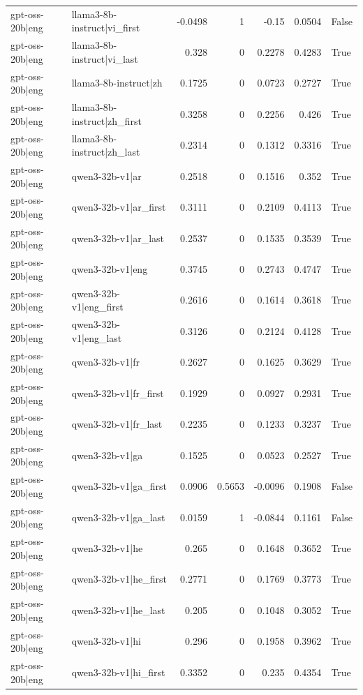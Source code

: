\begin{table}
\begin{tabular}{l l r r r r l}
gpt-oss-20b|eng & llama3-8b-instruct|vi_first & -0.0498 & 1 & -0.15 & 0.0504 & False \\
gpt-oss-20b|eng & llama3-8b-instruct|vi_last & 0.328 & 0 & 0.2278 & 0.4283 & True \\
gpt-oss-20b|eng & llama3-8b-instruct|zh & 0.1725 & 0 & 0.0723 & 0.2727 & True \\
gpt-oss-20b|eng & llama3-8b-instruct|zh_first & 0.3258 & 0 & 0.2256 & 0.426 & True \\
gpt-oss-20b|eng & llama3-8b-instruct|zh_last & 0.2314 & 0 & 0.1312 & 0.3316 & True \\
gpt-oss-20b|eng & qwen3-32b-v1|ar & 0.2518 & 0 & 0.1516 & 0.352 & True \\
gpt-oss-20b|eng & qwen3-32b-v1|ar_first & 0.3111 & 0 & 0.2109 & 0.4113 & True \\
gpt-oss-20b|eng & qwen3-32b-v1|ar_last & 0.2537 & 0 & 0.1535 & 0.3539 & True \\
gpt-oss-20b|eng & qwen3-32b-v1|eng & 0.3745 & 0 & 0.2743 & 0.4747 & True \\
gpt-oss-20b|eng & qwen3-32b-v1|eng_first & 0.2616 & 0 & 0.1614 & 0.3618 & True \\
gpt-oss-20b|eng & qwen3-32b-v1|eng_last & 0.3126 & 0 & 0.2124 & 0.4128 & True \\
gpt-oss-20b|eng & qwen3-32b-v1|fr & 0.2627 & 0 & 0.1625 & 0.3629 & True \\
gpt-oss-20b|eng & qwen3-32b-v1|fr_first & 0.1929 & 0 & 0.0927 & 0.2931 & True \\
gpt-oss-20b|eng & qwen3-32b-v1|fr_last & 0.2235 & 0 & 0.1233 & 0.3237 & True \\
gpt-oss-20b|eng & qwen3-32b-v1|ga & 0.1525 & 0 & 0.0523 & 0.2527 & True \\
gpt-oss-20b|eng & qwen3-32b-v1|ga_first & 0.0906 & 0.5653 & -0.0096 & 0.1908 & False \\
gpt-oss-20b|eng & qwen3-32b-v1|ga_last & 0.0159 & 1 & -0.0844 & 0.1161 & False \\
gpt-oss-20b|eng & qwen3-32b-v1|he & 0.265 & 0 & 0.1648 & 0.3652 & True \\
gpt-oss-20b|eng & qwen3-32b-v1|he_first & 0.2771 & 0 & 0.1769 & 0.3773 & True \\
gpt-oss-20b|eng & qwen3-32b-v1|he_last & 0.205 & 0 & 0.1048 & 0.3052 & True \\
gpt-oss-20b|eng & qwen3-32b-v1|hi & 0.296 & 0 & 0.1958 & 0.3962 & True \\
gpt-oss-20b|eng & qwen3-32b-v1|hi_first & 0.3352 & 0 & 0.235 & 0.4354 & True \\

\end{tabular}
\end{table}
